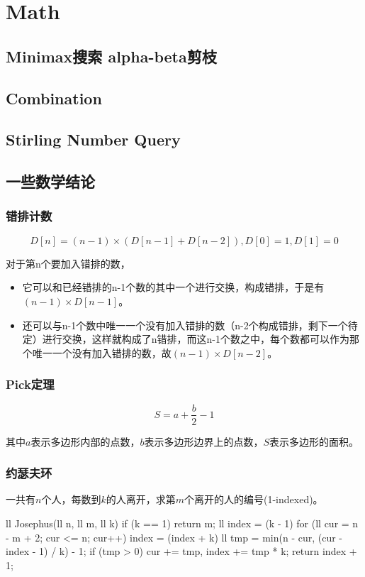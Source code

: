 \chapter{Math}
\section{Minimax搜索 alpha-beta剪枝}

\section{Combination}

\section{Stirling Number Query}

\section{一些数学结论}
\subsection{错排计数}
\[ D[n] = (n-1)\times(D[n-1]+D[n-2]), D[0] = 1, D[1] = 0 \]

对于第n个要加入错排的数，
\begin{itemize}
  \item 它可以和已经错排的n-1个数的其中一个进行交换，构成错排，于是有 $(n-1)\times D[n-1]$。
  \item 还可以与n-1个数中唯一一个没有加入错排的数（n-2个构成错排，剩下一个待定）进行交换，这样就构成了n错排，而这n-1个数之中，每个数都可以作为那个唯一一个没有加入错排的数，故$(n-1)\times D[n-2]$。
\end{itemize}

\subsection{Pick定理}
\[ S=a+\frac{b}{2}-1 \]

其中$a$表示多边形内部的点数，$b$表示多边形边界上的点数，$S$表示多边形的面积。

\subsection{约瑟夫环}
一共有$n$个人，每数到$k$的人离开，求第$m$个离开的人的编号(1-indexed)。
\begin{cpplist}
ll Josephus(ll n, ll m, ll k) {
  if (k == 1) return m;
  ll index = (k - 1) %
  for (ll cur = n - m + 2; cur <= n; cur++) {
    index = (index + k) %
    ll tmp = min(n - cur, (cur - index - 1) / k) - 1;
    if (tmp > 0) cur += tmp, index += tmp * k;
  }
  return index + 1;
}
\end{cpplist}